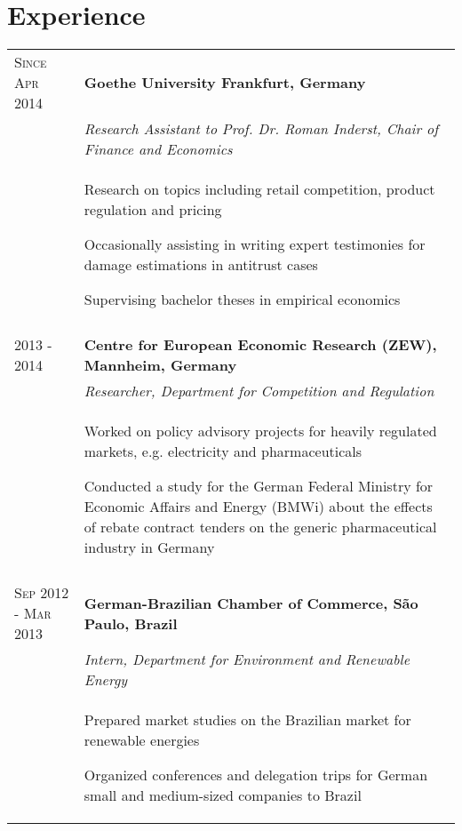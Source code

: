 \documentclass[a4paper,10pt]{article} %
\begin{document}
\section{Experience}


\begin{tabular}{P{4.5cm} P{10cm}}

\textsc{Since Apr 2014} & \textbf{Goethe University Frankfurt, Germany}\\
  & \emph{Research Assistant to Prof. Dr. Roman Inderst, Chair of Finance and Economics}\\ 
& \begin{itemize}\footnotesize{
\item Research on topics including retail competition, product regulation and pricing
\item Occasionally assisting in writing expert testimonies for damage estimations in antitrust cases
\item Supervising bachelor theses in empirical economics
}
\end{itemize}\\
 \\



\textsc{2013 - 2014} &  \textbf{Centre for European Economic Research (ZEW), Mannheim, Germany} \\
 & \emph{Researcher, Department for Competition and Regulation} \\
& \begin{itemize}\footnotesize{
\item Worked on policy advisory projects for heavily regulated markets, e.g. electricity and pharmaceuticals
\item Conducted a study for the German Federal Ministry for Economic Affairs and Energy (BMWi) about the effects of rebate contract tenders on the generic pharmaceutical industry in Germany
}
\end{itemize}\\
 \\



\textsc{Sep 2012 - Mar 2013} &  \textbf{German-Brazilian Chamber of Commerce, S\~ao Paulo, Brazil}\\
 & \emph{Intern, Department for Environment and  Renewable Energy}\\
& \begin{itemize}\footnotesize{
\item Prepared market studies on the Brazilian market for renewable energies
\item Organized conferences and delegation trips for German small and medium-sized companies to Brazil
}
\end{itemize}\\ 
\end{tabular}
\end{document}
